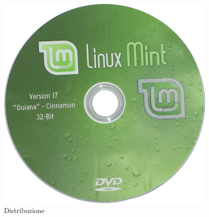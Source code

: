 \documentclass{beamer}
\begin{document}
\begin{frame}
\begin{minipage}[b][.35\textheight][t]{.3\textwidth}
    \includegraphics[width=.7\textwidth]{img/mint-dvd.png}\\
    \centering
    Distribuzione
    \end{minipage}
\end{frame}
\end{document}

